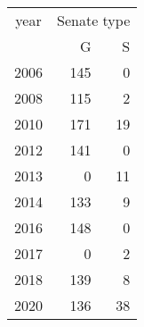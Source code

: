 \footnotesize\begin{tabular}[t]{lrr}
\toprule
\multicolumn{1}{c}{year} & \multicolumn{2}{c}{Senate type} \\
\cmidrule(l{3pt}r{3pt}){1-1} \cmidrule(l{3pt}r{3pt}){2-3}
  & G & S\\
\midrule
2006 & 145 & 0\\
2008 & 115 & 2\\
2010 & 171 & 19\\
2012 & 141 & 0\\
2013 & 0 & 11\\
2014 & 133 & 9\\
2016 & 148 & 0\\
2017 & 0 & 2\\
2018 & 139 & 8\\
2020 & 136 & 38\\
\bottomrule
\end{tabular}
